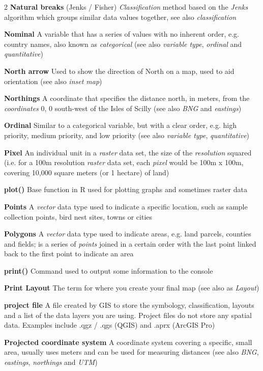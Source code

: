 \documentclass[a4paper,10pt]{article}
\begin{document}
\begin{multicols}{2}
\textbf{Natural breaks} (Jenks / Fisher) \textit{Classification} method based on the \textit{Jenks} algorithm which groups similar data values together, see also \textit{classification}

\textbf{Nominal} A variable that has a series of values with no inherent order, e.g. country names, also known as \textit{categorical} (see also \textit{variable type}, \textit{ordinal} and \textit{quantitative})

\textbf{North arrow} Used to show the direction of North on a map, used to aid orientation (see also \textit{inset map})

\textbf{Northings} A coordinate that specifies the distance north, in meters, from the \textit{coordinates} 0, 0 south-west of the Isles of Scilly (see also \textit{BNG} and \textit{eastings})

\textbf{Ordinal} Similar to a categorical variable, but with a clear order, e.g. high priority, medium priority, and low priority (see also \textit{variable type}, \textit{quantitative}) 

\textbf{Pixel} An individual unit in a \textit{raster} data set, the size of the \textit{resolution} squared (i.e. for a 100m resolution \textit{raster} data set, each \textit{pixel} would be 100m x 100m, covering 10,000 square meters (or 1 hectare) of land)

\textbf{plot()} Base function in R used for plotting graphs and sometimes raster data

\textbf{Points} A \textit{vector} data type used to indicate a specific location, such as sample collection points, bird nest sites, towns or cities

\textbf{Polygons} A \textit{vector} data type used to indicate areas, e.g. land parcels, counties and fields; is a series of \textit{points} joined in a certain order with the last point linked back to the first point to indicate an area

\textbf{print()} Command used to output some information to the console

\textbf{Print Layout} The term for where you create your final map (see also as \textit{Layout})

\textbf{project file} A file created by GIS to store the symbology, classification, layouts and a list of the data layers you are using. Project files do not store any spatial data. Examples include .qgz / .qgs (QGIS) and .aprx (ArcGIS Pro)

\textbf{Projected coordinate system} A coordinate system covering a specific, small area, usually uses meters and can be used for measuring distances (see also \textit{BNG}, \textit{eastings}, \textit{northings} and \textit{UTM})


\end{multicols}
\end{document}

